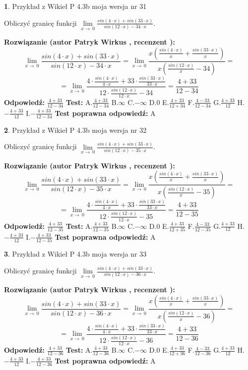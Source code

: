\documentclass[12pt, a4paper]{article}
\theoremstyle{definition} %
\newtheorem{zad}{}
\newcommand{\zadStart}[1]{\begin{zad}#1\newline}
\newcommand{\zadStop}{\end{zad}}
\newcommand{\rozwStart}[2]{\noindent \textbf{Rozwiązanie (autor #1 , recenzent #2): }\newline}
\newcommand{\rozwStop}{\newline}
\newcommand{\odpStart}{\noindent \textbf{Odpowiedź:}\newline}
\newcommand{\odpStop}{\newline}
\newcommand{\testStart}{\noindent \textbf{Test:}\newline}
\newcommand{\testStop}{\newline}
\newcommand{\kluczStart}{\noindent \textbf{Test poprawna odpowiedź:}\newline}
\newcommand{\kluczStop}{\newline}
\begin{document}
\zadStart{Przykład z Wikieł P 4.3b moja wersja nr 31}


Obliczyć granicę funkcji $\lim\limits_{x\to\ 0}\frac{sin(4 \cdot x)+sin(33 \cdot x)}{sin(12 \cdot x)-34 \cdot x}$.
\zadStop
\rozwStart{Patryk Wirkus}{}
$$\lim\limits_{x\to\ 0}\frac{sin(4 \cdot x)+sin(33 \cdot x)}{sin(12 \cdot x)-34 \cdot x}=\lim\limits_{x\to\ 0}\frac{x(\frac{sin(4 \cdot x)}{x}+\frac{sin(33 \cdot x)}{x})}{x(\frac{sin(12 \cdot x)}{x}-34)}=$$
$$=\lim\limits_{x\to\ 0}\frac{4 \cdot \frac{sin(4 \cdot x)}{4 \cdot x}+33 \cdot \frac{sin(33 \cdot x)}{33 \cdot x}}{12 \cdot \frac{sin(12 \cdot x)}{12 \cdot x}-34}=\frac{4+33}{12-34}$$
\rozwStop
\odpStart
$\frac{4+33}{12-34}$
\odpStop
\testStart
A.$\frac{4+33}{12-34}$
B.$\infty$
C.$-\infty$
D.$0$
E.$\frac{4+33}{12+34}$
F.$\frac{4-33}{12-34}$
G.$\frac{4+33}{12}$
H.$-\frac{4+33}{12}$
I.$-\frac{4+33}{12-34}$
\testStop
\kluczStart
A
\kluczStop



\zadStart{Przykład z Wikieł P 4.3b moja wersja nr 32}


Obliczyć granicę funkcji $\lim\limits_{x\to\ 0}\frac{sin(4 \cdot x)+sin(33 \cdot x)}{sin(12 \cdot x)-35 \cdot x}$.
\zadStop
\rozwStart{Patryk Wirkus}{}
$$\lim\limits_{x\to\ 0}\frac{sin(4 \cdot x)+sin(33 \cdot x)}{sin(12 \cdot x)-35 \cdot x}=\lim\limits_{x\to\ 0}\frac{x(\frac{sin(4 \cdot x)}{x}+\frac{sin(33 \cdot x)}{x})}{x(\frac{sin(12 \cdot x)}{x}-35)}=$$
$$=\lim\limits_{x\to\ 0}\frac{4 \cdot \frac{sin(4 \cdot x)}{4 \cdot x}+33 \cdot \frac{sin(33 \cdot x)}{33 \cdot x}}{12 \cdot \frac{sin(12 \cdot x)}{12 \cdot x}-35}=\frac{4+33}{12-35}$$
\rozwStop
\odpStart
$\frac{4+33}{12-35}$
\odpStop
\testStart
A.$\frac{4+33}{12-35}$
B.$\infty$
C.$-\infty$
D.$0$
E.$\frac{4+33}{12+35}$
F.$\frac{4-33}{12-35}$
G.$\frac{4+33}{12}$
H.$-\frac{4+33}{12}$
I.$-\frac{4+33}{12-35}$
\testStop
\kluczStart
A
\kluczStop



\zadStart{Przykład z Wikieł P 4.3b moja wersja nr 33}


Obliczyć granicę funkcji $\lim\limits_{x\to\ 0}\frac{sin(4 \cdot x)+sin(33 \cdot x)}{sin(12 \cdot x)-36 \cdot x}$.
\zadStop
\rozwStart{Patryk Wirkus}{}
$$\lim\limits_{x\to\ 0}\frac{sin(4 \cdot x)+sin(33 \cdot x)}{sin(12 \cdot x)-36 \cdot x}=\lim\limits_{x\to\ 0}\frac{x(\frac{sin(4 \cdot x)}{x}+\frac{sin(33 \cdot x)}{x})}{x(\frac{sin(12 \cdot x)}{x}-36)}=$$
$$=\lim\limits_{x\to\ 0}\frac{4 \cdot \frac{sin(4 \cdot x)}{4 \cdot x}+33 \cdot \frac{sin(33 \cdot x)}{33 \cdot x}}{12 \cdot \frac{sin(12 \cdot x)}{12 \cdot x}-36}=\frac{4+33}{12-36}$$
\rozwStop
\odpStart
$\frac{4+33}{12-36}$
\odpStop
\testStart
A.$\frac{4+33}{12-36}$
B.$\infty$
C.$-\infty$
D.$0$
E.$\frac{4+33}{12+36}$
F.$\frac{4-33}{12-36}$
G.$\frac{4+33}{12}$
H.$-\frac{4+33}{12}$
I.$-\frac{4+33}{12-36}$
\testStop
\kluczStart
A
\kluczStop
\end{document}
